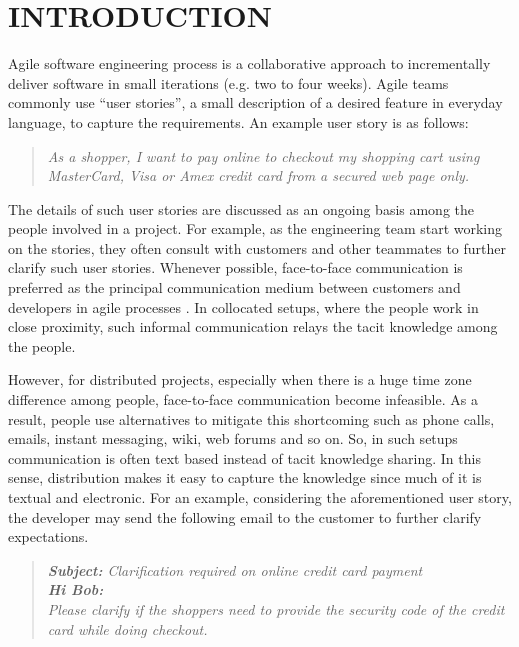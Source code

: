 \fancyhead[RO,LE]{\thepage}
\fancyfoot{} 
\chapter{INTRODUCTION}
Agile software engineering process is a collaborative approach to incrementally deliver software in small iterations (e.g. two to four weeks). Agile teams commonly use ``user stories'', a small description of a desired feature in everyday language, to capture the requirements. An example user story is as follows:\\
\begin{quote}
\emph{As a shopper, I want to pay online to checkout my shopping cart using MasterCard, Visa or Amex credit card from a secured web page only.}\\
\end{quote}
The details of such user stories are discussed as an ongoing basis among the people involved in a project. For example, as the engineering team start working on the stories, they often consult with customers and other teammates to further clarify such user stories. Whenever possible, face-to-face communication is preferred as the principal communication medium between customers and developers in agile processes \cite{am} \cite{xp} \cite{scrum} \cite{xp_up}. In collocated setups, where the people work in close proximity, such informal communication relays the tacit knowledge among the people. 

However, for distributed projects, especially when there is a huge time zone difference among people, face-to-face communication become infeasible. As a result, people use alternatives to mitigate this shortcoming such as phone calls, emails, instant messaging, wiki, web forums and so on. So, in such setups communication is often text based instead of tacit knowledge sharing. In this sense, distribution makes it easy to capture the knowledge since much of it is textual and electronic. For an example, considering the aforementioned user story, the developer may send the following email to the customer to further clarify expectations.\\

\begin{quote}
\emph{\textbf{Subject:} Clarification required on online credit card payment\\
\textbf{Hi Bob:}\\
Please clarify if the shoppers need to provide the security code of the credit card while doing checkout.}
\end{quote}

